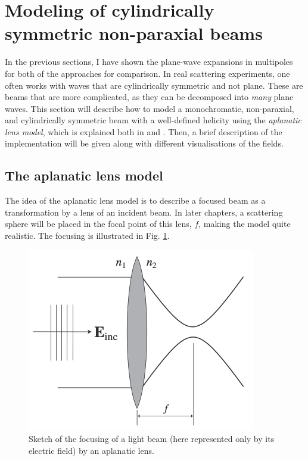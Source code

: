 \section{Modeling of cylindrically symmetric non-paraxial beams}
In the previous sections, I have shown the plane-wave expansions in multipoles for both of the approaches for comparison. In real scattering experiments, one often works with waves that are cylindrically symmetric and not plane. These are beams that are more complicated, as they can be decomposed into \textit{many} plane waves\cite{xavi}. 
This section will describe how to model a monochromatic, non-paraxial, and cylindrically symmetric beam with a well-defined helicity using the \textit{aplanatic lens model}, which is explained both in \cite{nanooptics} and \cite{xavi}. Then, a brief description of the implementation will be given along with different visualisations of the fields.
\subsection{The aplanatic lens model}
The idea of the aplanatic lens model is to describe a focused beam as a transformation by a lens of an incident beam. In later chapters, a scattering sphere will be placed in the focal point of this lens, $f$, making the model quite realistic. The focusing is illustrated in Fig. \ref{fig:aplanatic}.

\begin{figure}[!h]
    \centering
    \includegraphics[width=0.5\linewidth]{Figures/aplanatic_lens.png}
    \caption{Sketch of the focusing of a light beam (here represented only by its electric field) by an aplanatic lens.\cite{nanooptics}}
    \label{fig:aplanatic}
\end{figure}


